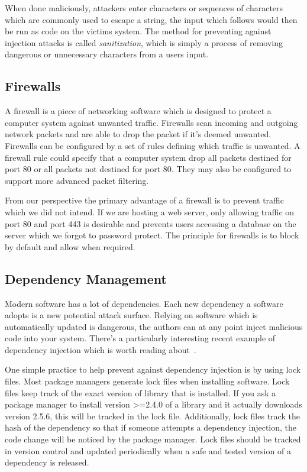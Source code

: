 When done maliciously, attackers enter characters or sequences of characters which are commonly used to escape a string,
the input which follows would then be run as code on the victims system.
The method for preventing against injection attacks is called \textsl{sanitization},
which is simply a process of removing dangerous or unnecessary characters from a users input.

\subsection{Firewalls}
A firewall is a piece of networking software which is designed to protect a computer system against unwanted traffic.
Firewalls scan incoming and outgoing network packets and are able to drop the packet if it's deemed unwanted.
Firewalls can be configured by a set of rules defining which traffic is unwanted.
A firewall rule could specify that a computer system drop all packets destined for port 80 or all packets not destined for port 80.
They may also be configured to support more advanced packet filtering.

From our perspective the primary advantage of a firewall is to prevent traffic which we did not intend.
If we are hosting a web server, only allowing traffic on port 80 and port 443 is desirable
and prevents users accessing a database on the server which we forgot to password protect.
The principle for firewalls is to block by default and allow when required.

\subsection{Dependency Management}
Modern software has a lot of dependencies.
Each new dependency a software adopts is a new potential attack surface.
Relying on software which is automatically updated is dangerous,
the authors can at any point inject malicious code into your system.
There's a particularly interesting recent example of dependency injection which is worth reading about~\cite{color-js}.

One simple practice to help prevent against dependency injection is by using lock files.
Most package managers generate lock files when installing software.
Lock files keep track of the exact version of library that is installed.
If you ask a package manager to install version >=2.4.0 of a library and it actually downloads version 2.5.6,
this will be tracked in the lock file.
Additionally, lock files track the hash of the dependency so that if someone attempts a dependency injection,
the code change will be noticed by the package manager.
Lock files should be tracked in version control and updated periodically when a safe and tested version of a dependency is released.

